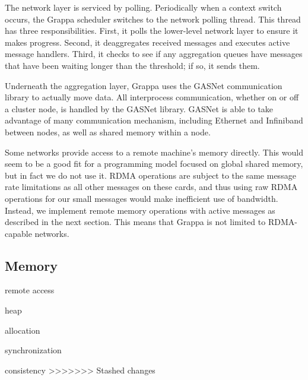The network layer is serviced by polling. Periodically when a context
switch occurs, the Grappa scheduler switches to the network polling
thread. This thread has three responsibilities. First, it polls the
lower-level network layer to ensure it makes progress. Second, it
deaggregates received messages and executes active message
handlers. Third, it checks to see if any aggregation queues have
messages that have been waiting longer than the threshold; if so, it
sends them.

Underneath the aggregation layer, Grappa uses the GASNet communication
library \cite{GASNet} to actually move data. All interprocess
communication, whether on or off a cluster node, is handled by the
GASNet library. GASNet is able to take advantage of many communication
mechanism, including Ethernet and Infiniband between nodes, as well as
shared memory within a node.

Some networks provide access to a remote machine's memory
directly. This would seem to be a good fit for a programming model
focused on global shared memory, but in fact we do not use it. RDMA
operations are subject to the same message rate limitations as all
other messages on these cards, and thus using raw RDMA operations for
our small messages would make inefficient use of bandwidth. Instead,
we implement remote memory operations with active messages as
described in the next section. This means that Grappa is not limited
to RDMA-capable networks.

\subsection{Memory}




remote access

heap

allocation

synchronization

consistency
>>>>>>> Stashed changes


